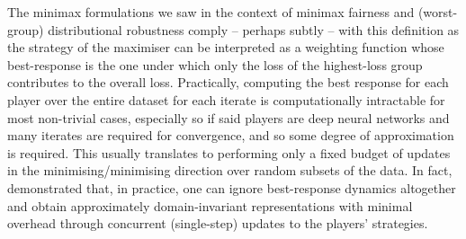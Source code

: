 %
The minimax formulations we saw in the context of minimax fairness and (worst-group) distributional
robustness comply -- perhaps subtly -- with this definition as the strategy of the maximiser can be
interpreted as a weighting function whose best-response is the one under which only the loss of the
highest-loss group contributes to the overall loss. 
%
Practically, computing the best response for each player over the entire dataset for each iterate is
computationally intractable for most non-trivial cases, especially so if said players are deep
neural networks and many iterates are required for convergence, and so some degree of approximation
is required.
%
This usually translates to performing only a fixed budget of updates in the minimising/minimising
direction over random subsets of the data.
%
In fact, \cite{ganin2016domain} demonstrated that, in practice, one can ignore best-response
dynamics altogether and obtain approximately domain-invariant representations with minimal overhead
through concurrent (single-step) updates to the players' strategies.

